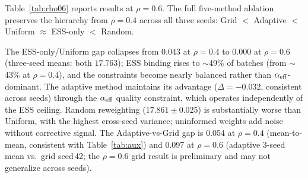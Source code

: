 Table~\ref{tab:rho06} reports results at $\rho{=}0.6$.
The full five-method ablation preserves the hierarchy from $\rho{=}0.4$ across all three seeds: Grid ${<}$ Adaptive ${<}$ Uniform ${\approx}$ ESS-only ${<}$ Random.

\begin{table}[h]
\centering
\small
{}
\caption{Results at $\rho{=}0.6$ (Qwen3-0.6B, $\nmin{=}2$).
Adaptive uses $\tau{=}0.7$ (consistent with main results); other methods are $\tau$-independent.
$^\ddagger$Post-hoc oracle; seed\,42 only.
Adaptive vs.\ Uniform: $\Delta{=}{-}0.032$, paired $t{=}{-}15.4$, $p{=}0.004$ (full precision; 3dp rounding yields $t{=}{-}9.95$, $p{=}0.010$).
ESS-only collapses onto Uniform (both $17.763$); Random ($17.861$) confirms detector signal is load-bearing.}
\label{tab:rho06}
\end{table}

The ESS-only/Uniform gap collapses from 0.043 at $\rho{=}0.4$ to 0.000 at $\rho{=}0.6$ (three-seed means: both $17.763$); ESS binding rises to ${\sim}$49\% of batches (from ${\sim}$43\% at $\rho{=}0.4$), and the constraints become nearly balanced rather than $\alpha_{\mathrm{eff}}$-dominant.
The adaptive method maintains its advantage ($\Delta{=}{-}0.032$, consistent across seeds) through the $\alpha_{\mathrm{eff}}$ quality constraint, which operates independently of the ESS ceiling.
Random reweighting ($17.861 \pm 0.025$) is substantially worse than Uniform, with the highest cross-seed variance; uninformed weights add noise without corrective signal.
The Adaptive-vs-Grid gap is 0.054 at $\rho{=}0.4$ (mean-to-mean, consistent with Table~\ref{tab:aux}) and 0.097 at $\rho{=}0.6$ (adaptive 3-seed mean vs.\ grid seed\,42; the $\rho{=}0.6$ grid result is preliminary and may not generalize across seeds).

